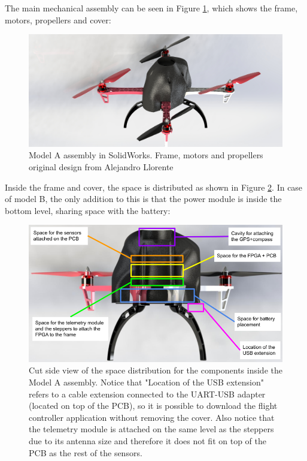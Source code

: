 The main mechanical assembly can be seen in Figure \ref{fig:hw_assembA}, which shows the frame, motors, propellers and cover:

\begin{figure} [H]
    \centering
    \includegraphics[width=\textwidth]{Figures/hardware/render_assemblyA.JPG}
    \caption{Model A assembly in SolidWorks. Frame, motors and propellers original design from Alejandro Llorente \cite{bib:droneCAD}}
    \label{fig:hw_assembA}
\end{figure}

Inside the frame and cover, the space is distributed as shown in Figure \ref{fig:hw_space}. In case of model B, the only addition to this is that the power module is inside the bottom level, sharing space with the battery: 

\begin{figure} [H]
    \centering
    \includegraphics[width=\textwidth]{Figures/hardware/drone_spaces.png}
    \caption{Cut side view of the space distribution for the components inside the Model A assembly. Notice that "Location of the USB extension" refers to a cable extension connected to the UART-USB adapter (located on top of the PCB), so it is possible to download the flight controller application without removing the cover. Also notice that the telemetry module is attached on the same level as the steppers due to its antenna size and therefore it does not fit on top of the PCB as the rest of the sensors.}
    \label{fig:hw_space}
\end{figure}


